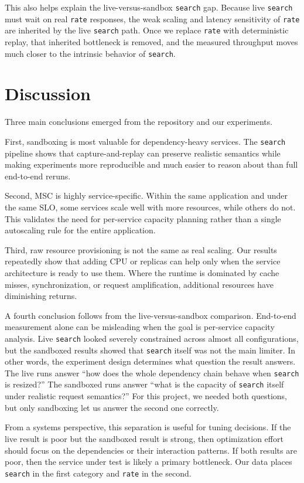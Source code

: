 \documentclass[conference]{IEEEtran}
\begin{document}
This also helps explain the live-versus-sandbox \texttt{search} gap. Because live \texttt{search} must wait on real \texttt{rate} responses, the weak scaling and latency sensitivity of \texttt{rate} are inherited by the live \texttt{search} path. Once we replace \texttt{rate} with deterministic replay, that inherited bottleneck is removed, and the measured throughput moves much closer to the intrinsic behavior of \texttt{search}.

\section{Discussion}
Three main conclusions emerged from the repository and our experiments.

First, sandboxing is most valuable for dependency-heavy services. The \texttt{search} pipeline shows that capture-and-replay can preserve realistic semantics while making experiments more reproducible and much easier to reason about than full end-to-end reruns.

Second, MSC is highly service-specific. Within the same application and under the same SLO, some services scale well with more resources, while others do not. This validates the need for per-service capacity planning rather than a single autoscaling rule for the entire application.

Third, raw resource provisioning is not the same as real scaling. Our results repeatedly show that adding CPU or replicas can help only when the service architecture is ready to use them. Where the runtime is dominated by cache misses, synchronization, or request amplification, additional resources have diminishing returns.

A fourth conclusion follows from the live-versus-sandbox comparison. End-to-end measurement alone can be misleading when the goal is per-service capacity analysis. Live \texttt{search} looked severely constrained across almost all configurations, but the sandboxed results showed that \texttt{search} itself was not the main limiter. In other words, the experiment design determines what question the result answers. The live runs answer ``how does the whole dependency chain behave when \texttt{search} is resized?'' The sandboxed runs answer ``what is the capacity of \texttt{search} itself under realistic request semantics?'' For this project, we needed both questions, but only sandboxing let us answer the second one correctly.

From a systems perspective, this separation is useful for tuning decisions. If the live result is poor but the sandboxed result is strong, then optimization effort should focus on the dependencies or their interaction patterns. If both results are poor, then the service under test is likely a primary bottleneck. Our data places \texttt{search} in the first category and \texttt{rate} in the second.
\end{document}
